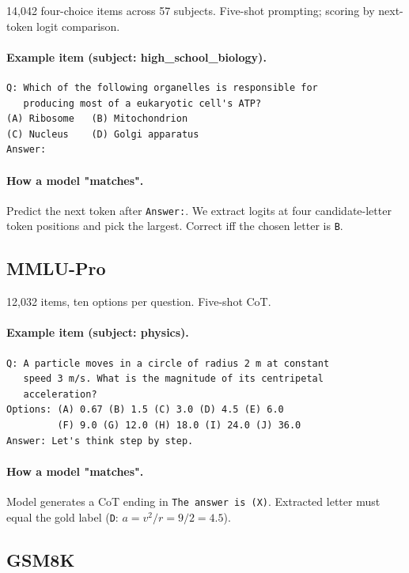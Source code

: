 14{,}042 four-choice items across 57 subjects. Five-shot prompting;
scoring by next-token logit comparison.

\paragraph{Example item (subject: high\_school\_biology).}
\begin{verbatim}
Q: Which of the following organelles is responsible for
   producing most of a eukaryotic cell's ATP?
(A) Ribosome   (B) Mitochondrion
(C) Nucleus    (D) Golgi apparatus
Answer:
\end{verbatim}

\paragraph{How a model "matches".} Predict the next token after
\verb|Answer:|. We extract logits at four candidate-letter token
positions and pick the largest. Correct iff the chosen letter is
\verb|B|.

\subsection{MMLU-Pro}
\label{app:ex-mmlu-pro}

12{,}032 items, ten options per question. Five-shot CoT.

\paragraph{Example item (subject: physics).}
\begin{verbatim}
Q: A particle moves in a circle of radius 2 m at constant
   speed 3 m/s. What is the magnitude of its centripetal
   acceleration?
Options: (A) 0.67 (B) 1.5 (C) 3.0 (D) 4.5 (E) 6.0
         (F) 9.0 (G) 12.0 (H) 18.0 (I) 24.0 (J) 36.0
Answer: Let's think step by step.
\end{verbatim}

\paragraph{How a model "matches".} Model generates a CoT ending in
\verb|The answer is (X)|. Extracted letter must equal the gold
label (\verb|D|: $a=v^2/r=9/2=4.5$).

\subsection{GSM8K}
\label{app:ex-gsm8k}

